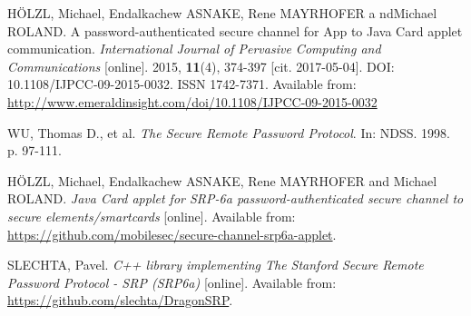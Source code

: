 \documentclass[12pt,a4paper]{article}
\begin{document}
\begin{thebibliography}{9}
HÖLZL, Michael, Endalkachew ASNAKE, Rene MAYRHOFER a ndMichael ROLAND. A password-authenticated secure channel for App to Java Card applet communication. \textit{International Journal of Pervasive Computing and Communications} [online]. 2015, \textbf{11}(4), 374-397 [cit. 2017-05-04]. DOI: 10.1108/IJPCC-09-2015-0032. ISSN 1742-7371. Available from: \url{http://www.emeraldinsight.com/doi/10.1108/IJPCC-09-2015-0032}

WU, Thomas D., et al. \textit{The Secure Remote Password Protocol}. In: NDSS. 1998. p. 97-111.

HÖLZL, Michael, Endalkachew ASNAKE, Rene MAYRHOFER and Michael ROLAND. \textit{Java Card applet for SRP-6a password-authenticated secure channel to secure elements/smartcards} [online]. Available from: \url{https://github.com/mobilesec/secure-channel-srp6a-applet}.

SLECHTA, Pavel. \textit{C++ library implementing The Stanford Secure Remote Password Protocol - SRP (SRP6a)} [online]. Available from: \url{https://github.com/slechta/DragonSRP}.
\end{thebibliography}
\end{document}
